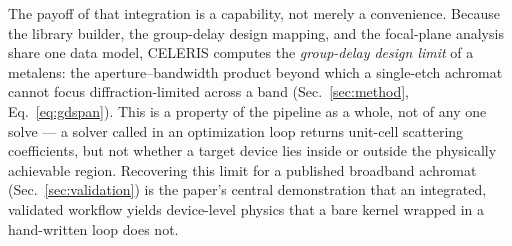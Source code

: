 \documentclass[preprint,12pt]{elsarticle}
\begin{document}
The payoff of that integration is a capability, not merely a convenience. Because the
library builder, the group-delay design mapping, and the focal-plane analysis share one
data model, CELERIS computes the \emph{group-delay design limit} of a metalens: the
aperture--bandwidth product beyond which a single-etch achromat cannot focus
diffraction-limited across a band (Sec.~\ref{sec:method}, Eq.~\eqref{eq:gdspan}). This is
a property of the pipeline as a whole, not of any one solve --- a solver called in an
optimization loop returns unit-cell scattering coefficients, but not whether a target
device lies inside or outside the physically achievable region. Recovering this limit for
a published broadband achromat (Sec.~\ref{sec:validation}) is the paper's central
demonstration that an integrated, validated workflow yields device-level physics that a
bare kernel wrapped in a hand-written loop does not.
\end{document}
